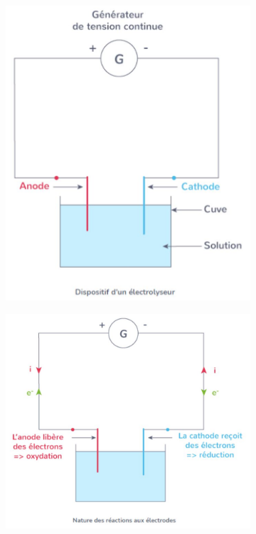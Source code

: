\documentclass[11pt,a4paper]{article}
\begin{document}
\begin{figure}[H]
\centering
\begin{subfigure}{.43\textwidth}
  \centering
  \includegraphics[width=.95\linewidth]{imgs/c6/electrolyseur.jpg}  
\end{subfigure}
\begin{subfigure}{.54\textwidth}
  \centering
  \includegraphics[width=.95\linewidth]{imgs/c6/anodcatho.jpg}  
\end{subfigure}
\end{figure}
 \newpage
\end{document}
